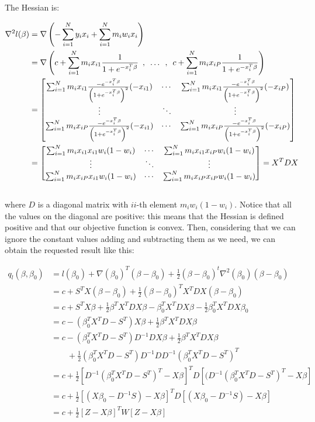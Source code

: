 \documentclass{article}
\begin{document}
The Hessian is:

\begin{align*}
\nabla^2 l(\beta)&=\nabla \left(-\sum_{i=1}^N y_i x_i+\sum_{i=1}^N m_i w_i x_i\right)\\
				 &=\nabla \left( c+\sum_{i=1}^N m_i x_{i1}\frac{1}{1+e^{-x_i^T\beta}}\enskip,\enskip \dots \enskip,\enskip c+\sum_{i=1}^N m_i x_{iP}\frac{1}{1+e^{-x_i^T\beta}} \right)\\
				 &=\begin{bmatrix} \sum_{i=1}^N m_i x_{i1}\frac{-e^{-x_i^T\beta}}{\left(1+e^{-x_i^T\beta}\right)^2}(-x_{i1}) & \cdots & \sum_{i=1}^N m_i x_{i1}\frac{-e^{-x_i^T\beta}}{\left(1+e^{-x_i^T\beta}\right)^2}(-x_{iP}) \\ \vdots & \ddots & \vdots \\ \sum_{i=1}^N m_i x_{iP}\frac{-e^{-x_i^T\beta}}{\left(1+e^{-x_i^T\beta}\right)^2}(-x_{i1}) & \cdots & \sum_{i=1}^N m_i x_{iP}\frac{-e^{-x_i^T\beta}}{\left(1+e^{-x_i^T\beta}\right)^2}(-x_{iP}) \end{bmatrix}\\
				 &=\begin{bmatrix} \sum_{i=1}^N m_i x_{i1}x_{i1}w_i(1-w_i) & \cdots & \sum_{i=1}^N m_i x_{i1}x_{iP}w_i(1-w_i) \\ \vdots & \ddots & \vdots \\ \sum_{i=1}^N m_i x_{iP}x_{i1}w_i(1-w_i) & \cdots & \sum_{i=1}^N m_i x_{iP}x_{iP}w_i(1-w_i) \end{bmatrix}=X^TDX
\end{align*}\\

where $D$ is a diagonal matrix with $ii$-th element $m_i w_i (1-w_i)$. Notice that all the values on the diagonal are positive: this means that the Hessian is defined positive and that our objective function is convex. Then, considering that we can ignore the constant values adding and subtracting them as we need, we can obtain the requested result like this:

\begin{align*}
q_l(\beta,\beta_0)&=l(\beta_0)+\nabla(\beta_0)^T(\beta-\beta_0)+\frac{1}{2}(\beta-\beta_0)^t\nabla^2(\beta_0)(\beta-\beta_0)\\
				  &=c+S^TX(\beta-\beta_0)+\frac{1}{2}(\beta-\beta_0)^TX^TDX(\beta-\beta_0)\\				  
				  &=c+S^TX\beta+\frac{1}{2}\beta^TX^TDX\beta-\beta_0^TX^TDX\beta-\frac{1}{2}\beta_0^TX^TDX\beta_0\\
				  &=c-(\beta_0^TX^TD-S^T)X\beta+\frac{1}{2}\beta^TX^TDX\beta\\
				  &=c-(\beta_0^TX^TD-S^T)D^{-1}DX\beta+\frac{1}{2}\beta^TX^TDX\beta\\
				  &\qquad+\frac{1}{2}(\beta_0^TX^TD-S^T)D^{-1}DD^{-1}(\beta_0^TX^TD-S^T)^T\\
				  &=c+\frac{1}{2}[D^{-1}(\beta_0^TX^TD-S^T)^T-X\beta]^TD[(D^{-1}(\beta_0^TX^TD-S^T)^T-X\beta]\\
				  &=c+\frac{1}{2}[(X\beta_0-D^{-1}S)-X\beta]^TD[(X\beta_0-D^{-1}S)-X\beta]\\
 				  &=c+\frac{1}{2}[Z-X\beta]^TW[Z-X\beta]
\end{align*}\\
\end{document}
